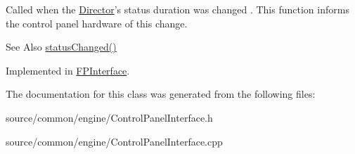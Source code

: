 Called when the \hyperlink{class_director}{Director}'s status duration was changed . This function informs the control panel hardware of this change. 

\begin{DoxySeeAlso}{See Also}
\hyperlink{class_control_panel_interface_a92942ce52b74c7e9d96fe05f5987ef50}{status\-Changed()} 
\end{DoxySeeAlso}


Implemented in \hyperlink{class_f_p_interface_ae096571c8ac5e609915ddab1a8608be9}{F\-P\-Interface}.



The documentation for this class was generated from the following files\-:\begin{DoxyCompactItemize}
\item 
source/common/engine/Control\-Panel\-Interface.\-h\item 
source/common/engine/Control\-Panel\-Interface.\-cpp\end{DoxyCompactItemize}
